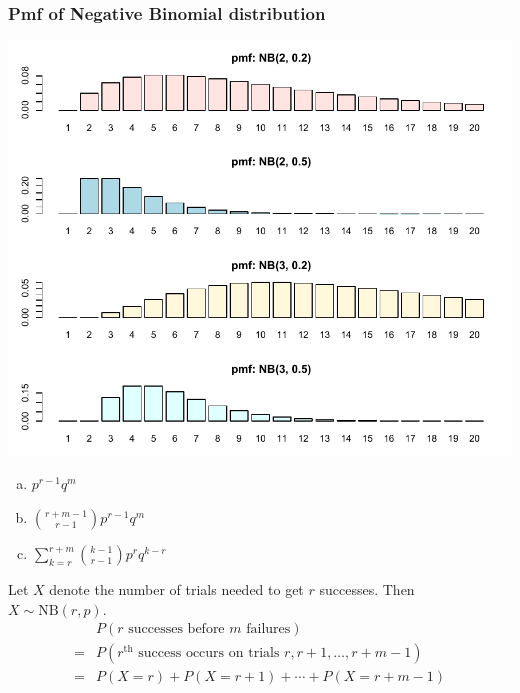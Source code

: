 \documentclass[slidestop,compress,mathserif]{beamer}
\begin{document}
\begin{frame}\frametitle{Pmf of Negative Binomial distribution}

\vspace{-0.5cm}
\begin{center}
\includegraphics[scale = 0.63]{figures/pmf5}
\end{center}

\end{frame}


\begin{frame}


\begin{enumerate}[(a)]
\item $p^{r-1} q^m$
\item ${r + m -1 \choose r-1}p^{r-1} q^m$
\item $\sum_{k = r}^{r + m} {k -1 \choose r-1}p^r q^{k - r}$
\end{enumerate}
\pause
Let $X$ denote the number of trials needed to get $r$ successes. Then
$ X \sim \text{NB}(r, p)$.
\begin{align*}
& P(r \text{ successes before } m \text{ failures}) \\
= & P(r^{\text{th}} \text{ success occurs on trials } r, r+1, \ldots, r+m-1)\\
= & P(X = r) + P(X = r+1) + \cdots + P(X = r+m-1)
\end{align*}


\end{frame}
\end{document}
